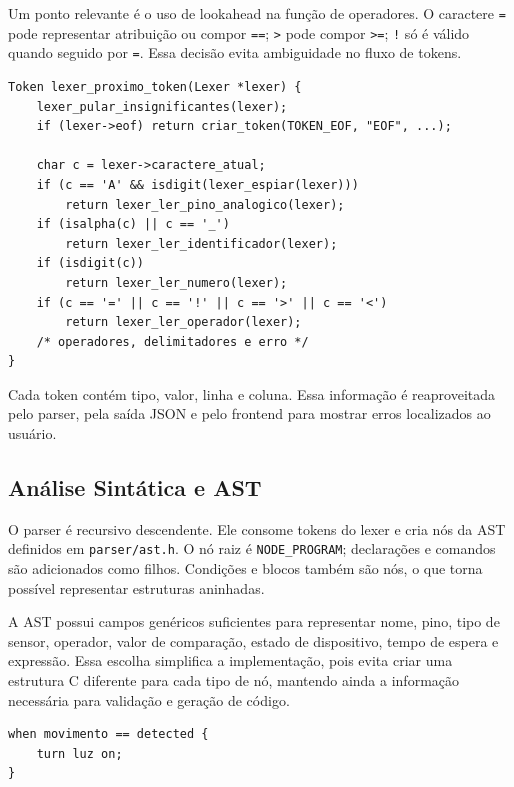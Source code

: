 \documentclass[conference]{IEEEtran}
\begin{document}
Um ponto relevante é o uso de lookahead na função de operadores. O caractere \texttt{=} pode representar atribuição ou compor \texttt{==}; \texttt{>} pode compor \texttt{>=}; \texttt{!} só é válido quando seguido por \texttt{=}. Essa decisão evita ambiguidade no fluxo de tokens.

\begin{lstlisting}[style=csmall,caption={Fluxo simplificado do lexer.},label={lst:lexer}]
Token lexer_proximo_token(Lexer *lexer) {
    lexer_pular_insignificantes(lexer);
    if (lexer->eof) return criar_token(TOKEN_EOF, "EOF", ...);

    char c = lexer->caractere_atual;
    if (c == 'A' && isdigit(lexer_espiar(lexer)))
        return lexer_ler_pino_analogico(lexer);
    if (isalpha(c) || c == '_')
        return lexer_ler_identificador(lexer);
    if (isdigit(c))
        return lexer_ler_numero(lexer);
    if (c == '=' || c == '!' || c == '>' || c == '<')
        return lexer_ler_operador(lexer);
    /* operadores, delimitadores e erro */
}
\end{lstlisting}

Cada token contém tipo, valor, linha e coluna. Essa informação é reaproveitada pelo parser, pela saída JSON e pelo frontend para mostrar erros localizados ao usuário.

\subsection{Análise Sintática e AST}

O parser é recursivo descendente. Ele consome tokens do lexer e cria nós da AST definidos em \texttt{parser/ast.h}. O nó raiz é \texttt{NODE\_PROGRAM}; declarações e comandos são adicionados como filhos. Condições e blocos também são nós, o que torna possível representar estruturas aninhadas.

A AST possui campos genéricos suficientes para representar nome, pino, tipo de sensor, operador, valor de comparação, estado de dispositivo, tempo de espera e expressão. Essa escolha simplifica a implementação, pois evita criar uma estrutura C diferente para cada tipo de nó, mantendo ainda a informação necessária para validação e geração de código.

\begin{lstlisting}[style=homescript,caption={Entrada usada para exemplo de AST.},label={lst:astinput}]
when movimento == detected {
    turn luz on;
}
\end{lstlisting}
\end{document}
